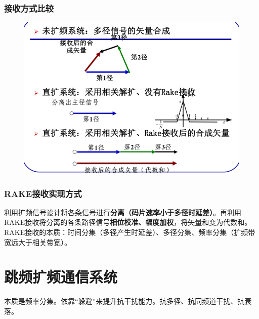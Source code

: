 \subsubsection{接收方式比较}
\begin{figure}[htbp]
	\centering
	\includegraphics[width=0.7\linewidth]{figures/screenshot001}
	\caption{}
	\label{fig:screenshot001}
\end{figure}
\subsubsection{RAKE接收实现方式}
利用扩频信号设计将各条信号进行\textbf{分离（码片速率小于多径时延差）}。再利用RAKE接收将分离的各条路径信号\textbf{相位校准、幅度加权}，将矢量和变为代数和。\\
RAKE接收的本质：时间分集（多径产生时延差）、多径分集、频率分集（扩频带宽远大于相关带宽）。
\section{跳频扩频通信系统}
本质是频率分集。依靠“躲避”来提升抗干扰能力。抗多径、抗同频道干扰、抗衰落。
